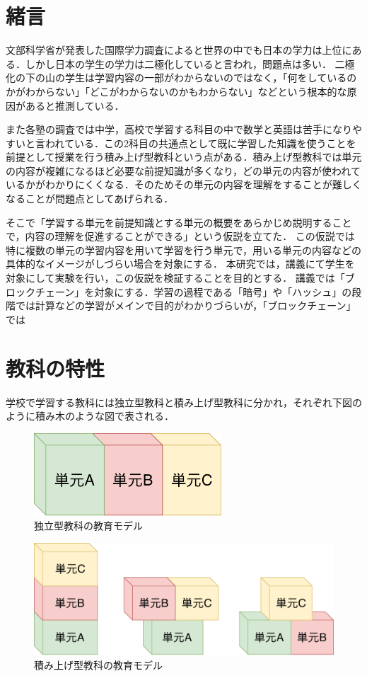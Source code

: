 \documentclass[a4j,12pt]{jsarticle}
\begin{document}

\semi

\section{緒言}
文部科学省が発表した国際学力調査によると世界の中でも日本の学力は上位にある．しかし日本の学生の学力は二極化していると言われ，問題点は多い．
二極化の下の山の学生は学習内容の一部がわからないのではなく，「何をしているのかがわからない」「どこがわからないのかもわからない」などという根本的な原因があると推測している．

また各塾の調査では中学，高校で学習する科目の中で数学と英語は苦手になりやすいと言われている．この2科目の共通点として既に学習した知識を使うことを前提として授業を行う積み上げ型教科という点がある．積み上げ型教科では単元の内容が複雑になるほど必要な前提知識が多くなり，どの単元の内容が使われているかがわかりにくくなる．そのためその単元の内容を理解をすることが難しくなることが問題点としてあげられる．

そこで「学習する単元を前提知識とする単元の概要をあらかじめ説明することで，内容の理解を促進することができる」という仮説を立てた．
この仮説では特に複数の単元の学習内容を用いて学習を行う単元で，用いる単元の内容などの具体的なイメージがしづらい場合を対象にする．
本研究では，講義にて学生を対象にして実験を行い，この仮説を検証することを目的とする．
講義では「ブロックチェーン」を対象にする．学習の過程である「暗号」や「ハッシュ」の段階では計算などの学習がメインで目的がわかりづらいが，「ブロックチェーン」では


\section{教科の特性}
学校で学習する教科には独立型教科と積み上げ型教科に分かれ，それぞれ下図のように積み木のような図で表される．

\begin{figure}[H]
\centering
\includegraphics[width=7cm]{02.pdf}
\caption{独立型教科の教育モデル}
\label{fig:02}
\end{figure} 

\begin{figure}[H]
\centering
\includegraphics[width=12cm]{03.pdf}
\caption{積み上げ型教科の教育モデル}
\label{fig:03}
\end{figure} 
\end{document}
